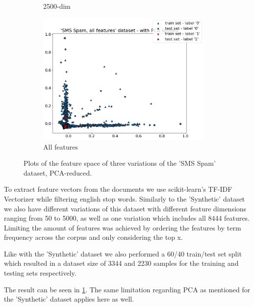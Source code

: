 \begin{figure}[h]
\begin{subfigure}[t]{0.32\textwidth}
        \caption{2500-dim}
    \end{subfigure}
    \begin{subfigure}[t]{0.32\textwidth}
        \centering
        \includegraphics[width=0.95\textwidth]{figures/'SMS Spam, all features' dataset - with PCA applied.png}
        \caption{All features}
    \end{subfigure}
    \caption{Plots of the feature space of three variations of the 'SMS Spam' dataset, PCA-reduced.}
    \label{fig:sms_spam_plot}
\end{figure}

To extract feature vectors from the documents we use scikit-learn's TF-IDF Vectorizer while filtering english stop words. Similarly to the 'Synthetic' dataset we also have different variations of this dataset with different feature dimensions ranging from 50 to 5000, as well as one variation which includes all 8444 features. Limiting the amount of features was achieved by ordering the features by term frequency across the corpus and only considering the top x.

Like with the 'Synthetic' dataset we also performed a 60/40 train/test set split which resulted in a dataset size of 3344 and 2230 samples for the training and testing sets respectively.

The result can be seen in \ref{fig:sms_spam_plot}. The same limitation regarding PCA as mentioned for the 'Synthetic' dataset applies here as well.
